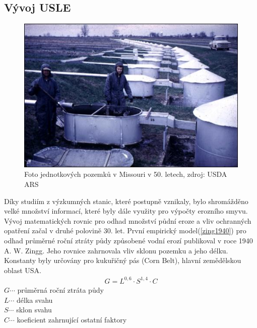 \subsection{Vývoj USLE}
\begin{figure}[H]
    \centering
      \includegraphics[scale=0.85]{./pictures/unit_plots.jpg}
      \caption[Foto jednotkových pozemků v Missouri v 50. letech]{Foto jednotkových pozemků v Missouri v 50. letech, zdroj: USDA ARS\cite{usda_ars}}
      \label{fig:unit_plots}
\end{figure}
Díky studiím z výzkumných stanic, které postupně vznikaly, bylo shromážděno velké množství informací, které byly dále využity pro výpočty erozního smyvu. Vývoj matematických rovnic pro odhad množství půdní eroze a vliv ochranných opatření začal v druhé polovině 30. let. První empirický model(\ref{zing1940}) pro odhad průměrné roční ztráty půdy způsobené vodní erozí publikoval v roce 1940 A. W. Zingg. Jeho rovnice zahrnovala vliv sklonu pozemku a jeho délku. Konstanty byly určovány pro kukuřičný pás (Corn Belt), hlavní zemědělskou oblast USA.\cite{ZINGG1940}
\begin{align}
   \label{zing1940} G=L^{0,6}\cdot S^{1,4}\cdot C
\end{align}
\hspace*{2cm}$G \cdots$ průměrná roční ztráta půdy\\
\hspace*{2cm}$L \cdots$ délka svahu \\ 
\hspace*{2cm}$S \cdots$ sklon svahu \\ 
\hspace*{2cm}$C \cdots$ koeficient zahrnující ostatní faktory\\

